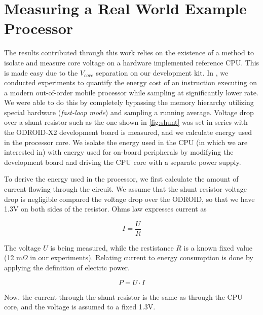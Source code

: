 \section{Measuring a Real World Example Processor}

The results contributed through this work relies on the existence of a method to
isolate and measure core voltage on a hardware implemented reference CPU. This
is made easy due to the $V_{core}$ separation on our development kit. In
\cite{rundehvatum2013exploring}, we conducted experiments to quantify the energy
cost of an instruction executing on a modern out-of-order mobile processor while
sampling at significantly lower rate. We were able to do this by completely
bypassing the memory hierarchy utilizing special hardware (\emph{fast-loop
mode}) and sampling a running average. Voltage drop over a shunt resistor such
as the one shown in \autoref{fig:shunt} was set in series with the ODROID-X2
development board is measured, and we calculate energy used in the processor
core. We isolate the energy used in the CPU (in which we are interested in) with
energy used for on-board peripherals by modifying the development board and
driving the CPU core with a separate power supply.

To derive the energy used in the processor, we first calculate the amount of
current flowing through the circuit. We assume that the shunt resistor voltage
drop is negligible compared the voltage drop over the ODROID, so that we have
1.3V on both sides of the resistor. Ohms law expresses current as

\begin{equation}
    I=\frac{U}{R}
    \label{eq:ohm}
\end{equation}

The voltage $U$ is being measured, while the restistance $R$ is a known fixed
value (12 m$\Omega$ in our experiments). Relating current to energy consumption
is done by applying the definition of electric power.

\begin{equation}
    P=U \cdot I
    \label{eq:power}
\end{equation}

Now, the current through the shunt resistor is the same as through the CPU core,
and the voltage is assumed to a fixed 1.3V.


